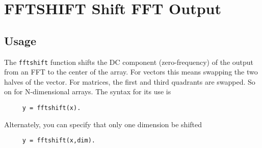 \section{FFTSHIFT Shift FFT Output}

\subsection{Usage}

The \verb|fftshift| function shifts the DC component (zero-frequency)
of the output from an FFT to the center of the array.  For vectors
this means swapping the two halves of the vector.  For matrices,
the first and third quadrants are swapped.  So on for N-dimensional
arrays.  The syntax for its use is
\begin{verbatim}
     y = fftshift(x).
\end{verbatim}
Alternately, you can specify that only one dimension be shifted
\begin{verbatim}
     y = fftshift(x,dim).
\end{verbatim}
